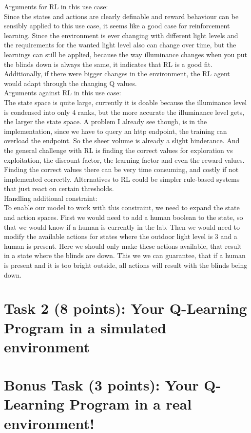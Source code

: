 \documentclass[11pt]{article}
\begin{document}
Arguments for RL in this use case:\\
Since the states and actions are clearly definable and reward behaviour can be sensibly applied to this use case, it seems like a good case for reinforcement learning. Since the environment is ever changing with different light levels and the requirements  for the wanted light level also can change over time, but the learnings can still be applied, because the way illuminance changes when you put the blinds down is always the same, it indicates that RL is a good fit. Additionally, if there were bigger changes in the environment, the RL agent would adapt through the changing Q values. \\
Arguments against RL in this use case:\\
The state space is quite large, currently it is doable because the illuminance level is condensed into only 4 ranks, but the more accurate the illuminance level gets, the larger the state space. A problem I already see though, is in the implementation, since we have to query an http endpoint, the training can overload the endpoint. So the sheer volume is already a slight hinderance. And the general challenge with RL is finding the correct values for exploration vs exploitation, the discount factor, the learning factor and even the reward values. Finding the correct values there can be very time consuming, and costly if not implemented correctly. Alternatives to RL could be simpler rule-based systems that just react on certain thresholds.\\
Handling additional constraint:\\
To enable our model to work with this constraint, we need to expand the state and action spaces. First we would need to add a human boolean to the state, so that we would know if a human is currently in the lab. Then we would need to modify the available actions for states where the outdoor light level is 3 and a human is present. Here we should only make these actions available, that result in a state where the blinds are down. This we we can guarantee, that if a human is present and it is too bright outside, all actions will result with the blinds being down.
\section*{Task 2 (8 points): Your Q-Learning Program in a simulated environment}
\section*{Bonus Task (3 points): Your Q-Learning Program in a real environment!}
\end{document}
